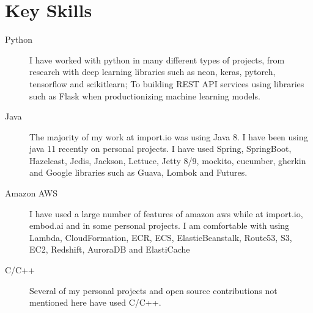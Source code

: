 \documentclass[a4paper]{article}
\def\tightlist{}
\begin{document}
\section{Key Skills}\label{key-skills}

\begin{description}
\tightlist
\item[Python]
I have worked with python in many different types of projects, from
research with deep learning libraries such as neon, keras, pytorch,
tensorflow and scikitlearn; To building REST API services using
libraries such as Flask when productionizing machine learning models.
\item[Java]
The majority of my work at import.io was using Java 8. I have been using
java 11 recently on personal projects. I have used Spring, SpringBoot,
Hazelcast, Jedis, Jackson, Lettuce, Jetty 8/9, mockito, cucumber,
gherkin and Google libraries such as Guava, Lombok and Futures.
\item[Amazon AWS]
I have used a large number of features of amazon aws while at import.io,
embod.ai and in some personal projects. I am comfortable with using
Lambda, CloudFormation, ECR, ECS, ElasticBeanstalk, Route53, S3, EC2,
Redshift, AuroraDB and ElastiCache
\item[C/C++]
Several of my personal projects and open source contributions not
mentioned here have used C/C++.
\end{description}
\end{document}
